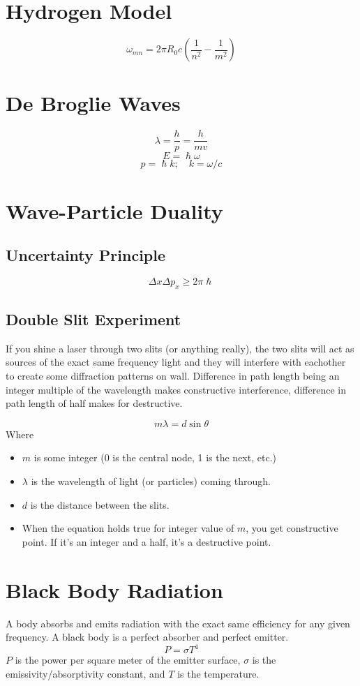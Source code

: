 \documentclass[a4paper,12pt]{report}
\begin{document}
\section{Hydrogen Model}
$$\omega_{mn}=2\pi R_0 c(\frac{1}{n^2} - \frac{1}{m^2})$$

\section{De Broglie Waves}
$$\lambda = \frac{h}{p} = \frac{h}{mv}$$
$$E = \hslash \omega$$
$$p = \hslash k; \,\,\,\,\,\, k = \omega/c$$

\section{Wave-Particle Duality}
\subsection{Uncertainty Principle}
$$\Delta x\Delta p_x \geq 2\pi \hslash$$
$$$$
\subsection{Double Slit Experiment}
If you shine a laser through two slits (or anything really), the two slits will act as sources of the exact same frequency light and they will 
interfere with eachother to create some diffraction patterns on wall. Difference in path length being an integer multiple of the wavelength makes 
constructive interference, difference in path length of half makes for destructive.

$$m \lambda = d\sin \theta$$
Where \begin{itemize}
\item $m$ is some integer (0 is the central node, 1 is the next, etc.)
\item $\lambda$ is the wavelength of light (or particles) coming through.
\item $d$ is the distance between the slits.
\item When the equation holds true for integer value of $m$, you get constructive point. If it's an integer and a half, it's a destructive point.
\end{itemize}


\section{Black Body Radiation}
A body absorbs and emits radiation with the exact same efficiency for any given frequency. A black body is a perfect absorber and perfect emitter. 
$$P=\sigma T^4$$
$P$ is the power per square meter of the emitter surface, $\sigma$ is the emissivity/absorptivity constant, and $T$ is the temperature.
\end{document}
